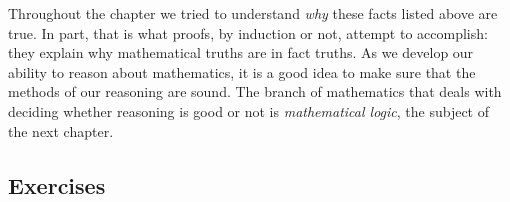 \documentclass[10pt,]{book}
\theoremstyle{plain}
\theoremstyle{definition}
\theoremstyle{definition}
\theoremstyle{definition}
\numberwithin{equation}{chapter}
\begin{document}
\par

      Throughout the chapter we tried to understand \emph{why} these facts listed above are true. In part, that is what proofs, by induction or not, attempt to accomplish: they explain why mathematical truths are in fact truths. As we develop our ability to reason about mathematics, it is a good idea to make sure that the methods of our reasoning are sound. The branch of mathematics that deals with deciding whether reasoning is good or not is \emph{mathematical logic}, the subject of the next chapter.
\typeout{************************************************}
\typeout{************************************************}
\subsection[Exercises]{Exercises}\label{exercises-17}
\end{document}
